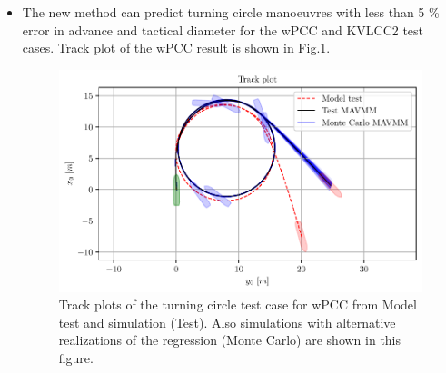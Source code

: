 \begin{itemize}
    \item The new method can predict turning circle manoeuvres with less than 5 \% error in advance and tactical diameter for the wPCC and KVLCC2 test cases. Track plot of the wPCC result is shown in Fig.\ref{fig:turning_circle_wpcc}.
    \begin{figure}[!htb]
    \centering
    \includegraphics{kappa/images/10.pdf}
    \caption{Track plots of the turning circle test case for wPCC from Model test and simulation (Test). Also simulations with alternative realizations of the regression (Monte Carlo) are shown in this figure.}
    \label{fig:turning_circle_wpcc}
    \end{figure}
    
\end{itemize}
